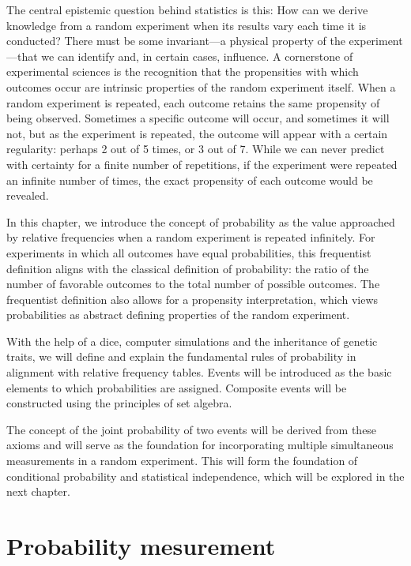 \documentclass[
]{book}
\begin{document}
The central epistemic question behind statistics is this: How can we derive knowledge from a random experiment when its results vary each time it is conducted? There must be some invariant---a physical property of the experiment---that we can identify and, in certain cases, influence. A cornerstone of experimental sciences is the recognition that the propensities with which outcomes occur are intrinsic properties of the random experiment itself. When a random experiment is repeated, each outcome retains the same propensity of being observed. Sometimes a specific outcome will occur, and sometimes it will not, but as the experiment is repeated, the outcome will appear with a certain regularity: perhaps 2 out of 5 times, or 3 out of 7. While we can never predict with certainty for a finite number of repetitions, if the experiment were repeated an infinite number of times, the exact propensity of each outcome would be revealed.

In this chapter, we introduce the concept of probability as the value approached by relative frequencies when a random experiment is repeated infinitely. For experiments in which all outcomes have equal probabilities, this frequentist definition aligns with the classical definition of probability: the ratio of the number of favorable outcomes to the total number of possible outcomes. The frequentist definition also allows for a propensity interpretation, which views probabilities as abstract defining properties of the random experiment.

With the help of a dice, computer simulations and the inheritance of genetic traits, we will define and explain the fundamental rules of probability in alignment with relative frequency tables. Events will be introduced as the basic elements to which probabilities are assigned. Composite events will be constructed using the principles of set algebra.

The concept of the joint probability of two events will be derived from these axioms and will serve as the foundation for incorporating multiple simultaneous measurements in a random experiment. This will form the foundation of conditional probability and statistical independence, which will be explored in the next chapter.

\hypertarget{probability-mesurement}{%
\section{Probability mesurement}\label{probability-mesurement}}
\end{document}
